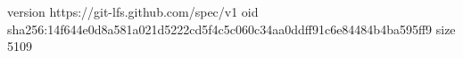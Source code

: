 version https://git-lfs.github.com/spec/v1
oid sha256:14f644e0d8a581a021d5222cd5f4c5c060c34aa0ddff91c6e84484b4ba595ff9
size 5109
